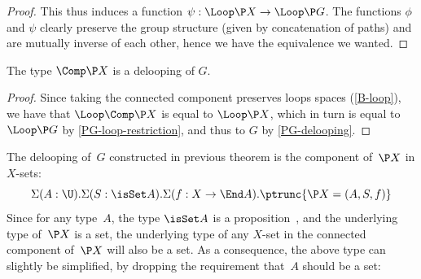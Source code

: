 \begin{proof}
  This thus induces a function $\psi:\Loop \P X\to\Loop\P G$. The functions
  $\phi$ and $\psi$ clearly preserve the group structure (given by
  concatenation of paths) and are mutually inverse of each other, hence we have the equivalence we wanted.
\end{proof}

\begin{theorem}
  \label{generated-delooping}
  The type $\Comp \P X$ is a delooping of $G$.
\end{theorem}
\begin{proof}
  Since taking the connected component preserves loops spaces (\cref{B-loop}),
  we have that $\Loop\Comp\P X$ is equal to $\Loop\P X$, which in turn is equal
  to $\Loop\P G$ by \cref{PG-loop-restriction}, and thus to $G$ by
  \cref{PG-delooping}.
\end{proof}

The delooping of~$G$ constructed in previous theorem is the component of~$\P X$
in $X$-sets:
\[
  \Sigma(A:\U).\Sigma(S:\isSet A).\Sigma(f:X\to\End A).\ptrunc{\P X=(A,S,f)}
\]
Since for any type~$A$, the type $\isSet A$ is a
proposition~\cite[Theorem~7.1.10]{hottbook}, and the underlying type of~$\P X$
is a set, the underlying type of any $X$-set in the connected component
of~$\P X$ will also be a set. As a consequence, the above type can slightly be
simplified, by dropping the requirement that~$A$ should be a set:

